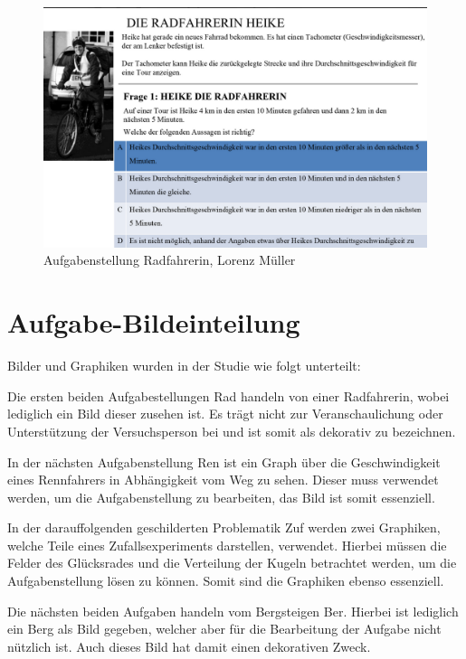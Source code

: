 \begin{figure}[H]
\noindent\hspace{0.5mm}\includegraphics[width=15cm]{./Ressourcen/Radfahrerin.png}
\caption{Aufgabenstellung Radfahrerin, Lorenz Müller}
\end{figure}

\section{Aufgabe-Bildeinteilung}

Bilder und Graphiken wurden in der Studie wie folgt unterteilt:

Die ersten beiden Aufgabestellungen \gls{Rad} handeln von einer Radfahrerin, wobei lediglich ein Bild dieser zusehen ist. Es trägt nicht zur Veranschaulichung oder Unterstützung der Versuchsperson bei und ist somit als dekorativ zu bezeichnen. 


In der nächsten Aufgabenstellung \gls{Ren} ist ein Graph über die Geschwindigkeit eines  Rennfahrers in Abhängigkeit vom Weg zu sehen. Dieser muss verwendet werden, um die Aufgabenstellung zu bearbeiten, das Bild ist somit essenziell. 


In der darauffolgenden geschilderten Problematik \gls{Zuf} werden zwei Graphiken, welche Teile eines Zufallsexperiments darstellen, verwendet. Hierbei müssen die Felder des Glücksrades und die Verteilung der Kugeln betrachtet werden, um die Aufgabenstellung lösen zu können. Somit sind die Graphiken ebenso essenziell.


Die nächsten beiden Aufgaben handeln vom Bergsteigen \gls{Ber}. Hierbei ist lediglich ein Berg als Bild gegeben, welcher aber für die Bearbeitung der Aufgabe nicht nützlich ist. Auch dieses Bild hat damit einen dekorativen Zweck.


